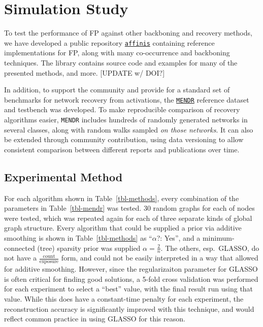 \documentclass[%
	12pt,
		oneside,
		letterpaper
]{book}
\begin{document}
\section{Simulation Study}\label{sec-FP-experiments}

To test the performance of FP against other backboning and recovery
methods, we have developed a public repository
\href{https://github.com/rtbs-dev/affinis}{\texttt{affinis}} containing
reference implementations for FP, along with many co-occurrence and
backboning techniques. The library contains source code and examples for
many of the presented methods, and more. {[}UPDATE w/ DOI?{]}

In addition, to support the community and provide for a standard set of
benchmarks for network recovery from activations, the
\href{https://github.com/rtbs-dev/mendr}{\texttt{MENDR}} reference
dataset and testbench was developed. To make reproducible comparison of
recovery algorithms easier, \texttt{MENDR} includes hundreds of randomly
generated networks in several classes, along with random walks sampled
\emph{on those networks}. It can also be extended through community
contribution, using data versioning to allow consistent comparison
between different reports and publications over time.

\subsection{Experimental Method}\label{experimental-method}

For each algorithm shown in Table~\ref{tbl-methods}, every combination
of the parameters in Table~\ref{tbl-mendr} was tested. 30 random graphs
for each of nodes were tested, which was repeated again for each of
three separate kinds of global graph structure. Every algorithm that
could be supplied a prior via additive smoothing is shown in
Table~\ref{tbl-methods} as ``\(\alpha\)?: Yes'', and a minimum-connected
(tree) sparsity prior was supplied \(\alpha=\tfrac{2}{n}\). The others,
esp.~GLASSO, do not have a \(\tfrac{\text{count}}{\text{exposure}}\)
form, and could not be easily interpreted in a way that allowed for
additive smoothing. However, since the regularizaiton parameter for
GLASSO is often critical for finding good solutions, a 5-fold cross
validation was performed for each experiment to select a ``best'' value,
with the final result run using that value. While this does have a
constant-time penalty for each experiment, the reconstruction accuracy
is significantly improved with this technique, and would reflect common
practice in using GLASSO for this reason.
\end{document}
